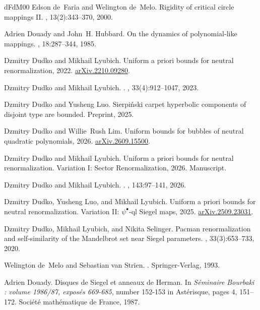 \documentclass{amsart}
\begin{document}
\begin{thebibliography}{dFdM00}
Edson de~Faria and Welington de~Melo.
\newblock Rigidity of critical circle mappings {II}.
, 13(2):343--370, 2000.

Adrien Douady and John~H. Hubbard.
\newblock On the dynamics of polynomial-like mappings.
, 18:287--344, 1985.

Dzmitry Dudko and Mikhail Lyubich.
\newblock Uniform a priori bounds for neutral renormalization, 2022.
\newblock \href{https://arxiv.org/abs/2210.09280}{arXiv.2210.09280}.

Dzmitry Dudko and Mikhail Lyubich.
.
, 33(4):912--1047, 2023.

Dzmitry Dudko and Yusheng Luo.
\newblock Sierpi{\'n}ski carpet hyperbolic components of disjoint type are bounded.
\newblock Preprint, 2025.

Dzmitry Dudko and Willie~Rush Lim.
\newblock Uniform bounds for bubbles of neutral quadratic polynomials, 2026.
\newblock \href{https://arxiv.org/abs/2609.15500}{arXiv.2609.15500}.


Dzmitry Dudko and Mikhail Lyubich.
\newblock Uniform a priori bounds for neutral renormalization. {Variation I: Sector Renormalization}, 2026.
\newblock Manuscript.

Dzmitry Dudko and Mikhail Lyubich.
.
, 143:97--141, 2026.


Dzmitry Dudko, Yusheng Luo, and Mikhail Lyubich.
\newblock Uniform a priori bounds for neutral renormalization. {Variation II}: $\psi^\bullet$-ql {Siegel} maps, 2025.
\newblock \href{https://arxiv.org/abs/2509.23031}{arXiv.2509.23031}.

Dzmitry Dudko, Mikhail Lyubich, and Nikita Selinger.
\newblock Pacman renormalization and self-similarity of the {Mandelbrot} set near {Siegel} parameters.
, 33(3):653--733, 2020.

Welington de~Melo and Sebastian van Strien.
.
\newblock Springer-Verlag, 1993.

Adrien Douady.
\newblock Disques de {S}iegel et anneaux de {H}erman.
\newblock In {\em S\'eminaire Bourbaki : volume 1986/87, expos\'es 669-685}, number 152-153 in Ast\'erisque, pages 4, 151--172. Soci\'et\'e math\'ematique de France, 1987.


\end{thebibliography}
\end{document}
